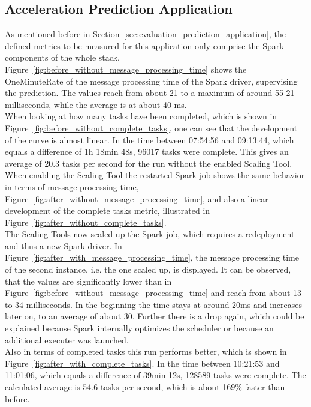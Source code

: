 



\subsection{Acceleration Prediction Application}
As mentioned before in Section~\ref{sec:evaluation_prediction_application}, the defined metrics to be measured for this application only comprise the Spark components of the whole stack.\\

Figure~\ref{fig:before_without_message_processing_time} shows the OneMinuteRate of the message processing time of the Spark driver, supervising the prediction.
The values reach from about 21 to a maximum of around 55 21 milliseconds, while the average is at about 40 ms.\\
When looking at how many tasks have been completed, which is shown in Figure~\ref{fig:before_without_complete_tasks}, one can see that the development of the curve is almost linear.
In the time between 07:54:56 and 09:13:44, which equals a difference of 1h 18min 48s, 96017 tasks were complete.
This gives an average of 20.3 tasks per second for the run without the enabled Scaling Tool.\\

When enabling the Scaling Tool the restarted Spark job shows the same behavior in terms of message processing time, Figure~\ref{fig:after_without_message_processing_time}, and also a linear development of the complete tasks metric, illustrated in Figure~\ref{fig:after_without_complete_tasks}.\\
The Scaling Tools now scaled up the Spark job, which requires a redeployment and thus a new Spark driver.
In Figure~\ref{fig:after_with_message_processing_time}, the message processing time of the second instance, i.e. the one scaled up, is displayed.
It can be observed, that the values are significantly lower than in Figure~\ref{fig:before_without_message_processing_time} and reach from about 13 to 34 milliseconds.
In the beginning the time stays at around 20ms and increases later on, to an average of about 30.
Further there is a drop again, which could be explained because Spark internally optimizes the scheduler or because an additional executer was launched.\\
Also in terms of completed tasks this run performs better, which is shown in Figure~\ref{fig:after_with_complete_tasks}.
In the time between 10:21:53 and 11:01:06, which equals a difference of 39min 12s, 128589 tasks were complete.
The calculated average is 54.6 tasks per second, which is about 169\% faster than before.


